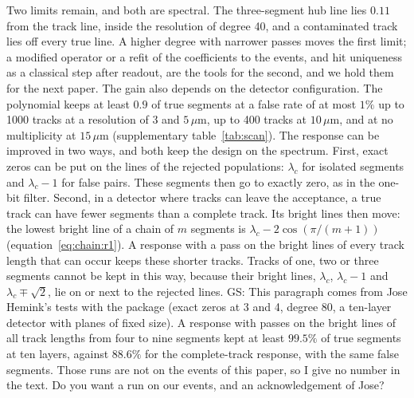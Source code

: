 \documentclass[11pt,a4paper]{article}
\newcommand{\gs}[1]{{\color{orange!85!black} GS: #1 }}
\newcommand{\gss}[1]{{\color{teal} #1}}
\begin{document}
Two limits remain, and both are spectral. The three-segment hub line lies $0.11$ from the track line,
inside the resolution of degree 40, and a contaminated track lies off every true line. A higher
degree with narrower passes moves the first limit; a modified operator or a refit of the
coefficients to the events, and hit uniqueness as a classical step after readout, are the tools
for the second, and we hold them for the next paper.
\gss{The gain also depends on the detector configuration. The polynomial keeps at least $0.9$ of true segments at a false rate of at most $1\%$ up to 1000 tracks at a resolution of $3$ and $5\,\mu$m, up to 400 tracks at $10\,\mu$m, and at no multiplicity at $15\,\mu$m (supplementary table~\ref{tab:scan}).}
\gss{The response can be improved in two ways, and both keep the design on the spectrum. First, exact zeros can be put on the lines of the rejected populations: $\lambda_c$ for isolated segments and $\lambda_c-1$ for false pairs. These segments then go to exactly zero, as in the one-bit filter. Second, in a detector where tracks can leave the acceptance, a true track can have fewer segments than a complete track. Its bright lines then move: the lowest bright line of a chain of $m$ segments is $\lambda_c-2\cos(\pi/(m+1))$ (equation~\eqref{eq:chain:r1}). A response with a pass on the bright lines of every track length that can occur keeps these shorter tracks. Tracks of one, two or three segments cannot be kept in this way, because their bright lines, $\lambda_c$, $\lambda_c-1$ and $\lambda_c\mp\sqrt2$, lie on or next to the rejected lines.} \gs{This paragraph comes from Jose Hemink's tests with the package (exact zeros at 3 and 4, degree 80, a ten-layer detector with planes of fixed size). A response with passes on the bright lines of all track lengths from four to nine segments kept at least $99.5\%$ of true segments at ten layers, against $88.6\%$ for the complete-track response, with the same false segments. Those runs are not on the events of this paper, so I give no number in the text. Do you want a run on our events, and an acknowledgement of Jose?}
\end{document}
